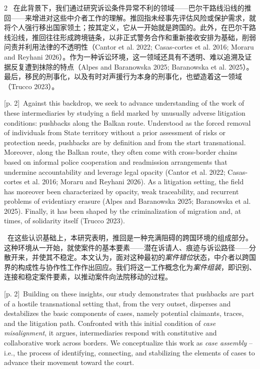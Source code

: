 \documentclass[10pt,a4paper]{article}
\begin{document}
\begin{paracol}{2}
\switchcolumn*
{\scriptsize\color{gray} [p. 2]}\ 在此背景下，我们通过研究诉讼条件异常不利的领域——巴尔干路线沿线的推回——来增进对这些中介者工作的理解。推回指未经事先评估风险或保护需求，就将个人强行移出国家领土；按其定义，它从一开始就是跨国的。此外，在巴尔干路线沿线，推回往往形成跨境链条，以非正式警务合作和重新接收安排为基础，削弱问责并利用法律的不透明性（Cantor et al. 2022; Casas-cortes et al. 2016; Moraru and Reyhani 2026）。作为一种诉讼环境，这一领域还具有不透明、难以追溯及证据反复遭到抹除的特点（Alpes and Baranowska 2025; Baranowska et al. 2025）。最后，移民的刑事化，以及有时对声援行为本身的刑事化，也塑造着这一领域（Trucco 2023）。\par
\switchcolumn
{\scriptsize\color{gray} [p. 2]}\ Against this backdrop, we seek to advance understanding of the work of these intermediaries by studying a field marked by unusually adverse litigation conditions: pushbacks along the Balkan route. Understood as the forced removal of individuals from State territory without a prior assessment of risks or protection needs, pushbacks are by definition and from the start transnational. Moreover, along the Balkan route, they often come with cross-border chains based on informal police cooperation and readmission arrangements that undermine accountability and leverage legal opacity (Cantor et al. 2022; Casas-cortes et al. 2016; Moraru and Reyhani 2026). As a litigation setting, the field has moreover been characterized by opacity, weak traceability, and recurrent problems of evidentiary erasure (Alpes and Baranowska 2025; Baranowska et al. 2025). Finally, it has been shaped by the criminalization of migration and, at times, of solidarity itself (Trucco 2023).\par
\switchcolumn*
{\scriptsize\color{gray} [p. 2]}\ 在这些认识基础上，本研究表明，推回是一种充满阻碍的跨国环境的组成部分。这种环境从一开始，就使案件的基本要素——潜在诉请人、痕迹与诉讼路径——分散开来，并使其不稳定。本文认为，面对这种最初的\textit{案件错位}状态，中介者以跨国界的构成性与协作性工作作出回应。我们将这一工作概念化为\textit{案件组装}，即识别、连接和稳定案件要素，以推动案件向法院移动的过程。\par
\switchcolumn
{\scriptsize\color{gray} [p. 2]}\ Building on these insights, our study demonstrates that pushbacks are part of a hostile transnational setting that, from the very outset, disperses and destabilizes the basic components of cases, namely potential claimants, traces, and the litigation path. Confronted with this initial condition of \textit{case misalignment}, it argues, intermediaries respond with constitutive and collaborative work across borders. We conceptualize this work as \textit{case assembly} – i.e., the process of identifying, connecting, and stabilizing the elements of cases to advance their movement toward the court.\par

\end{paracol}
\end{document}

